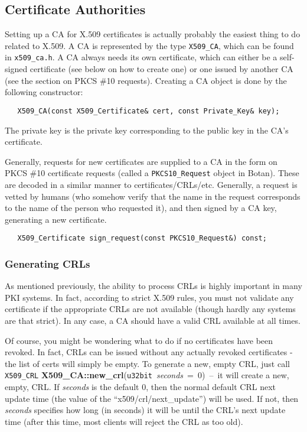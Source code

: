 \documentclass{article}
\newcommand{\filename}[1]{\texttt{#1}}
\newcommand{\function}[1]{\textbf{#1}}
\newcommand{\type}[1]{\texttt{#1}}
\renewcommand{\arg}[1]{\textsl{#1}}
\begin{document}
\subsection{Certificate Authorities}

Setting up a CA for X.509 certificates is actually probably the easiest thing
to do related to X.509. A CA is represented by the type \type{X509\_CA}, which
can be found in \filename{x509\_ca.h}. A CA always needs its own certificate,
which can either be a self-signed certificate (see below on how to create one)
or one issued by another CA (see the section on PKCS \#10 requests). Creating
a CA object is done by the following constructor:

\begin{verbatim}
   X509_CA(const X509_Certificate& cert, const Private_Key& key);
\end{verbatim}

The private key is the private key corresponding to the public key in the
CA's certificate.

Generally, requests for new certificates are supplied to a CA in the form on
PKCS \#10 certificate requests (called a \type{PKCS10\_Request} object in
Botan). These are decoded in a similar manner to
certificates/CRLs/etc. Generally, a request is vetted by humans (who somehow
verify that the name in the request corresponds to the name of the person who
requested it), and then signed by a CA key, generating a new certificate.

\begin{verbatim}
   X509_Certificate sign_request(const PKCS10_Request&) const;
\end{verbatim}

\subsubsection{Generating CRLs}

As mentioned previously, the ability to process CRLs is highly important in
many PKI systems. In fact, according to strict X.509 rules, you must not
validate any certificate if the appropriate CRLs are not available (though
hardly any systems are that strict). In any case, a CA should have a valid CRL
available at all times.

Of course, you might be wondering what to do if no certificates have been
revoked. In fact, CRLs can be issued without any actually revoked certificates
- the list of certs will simply be empty. To generate a new, empty CRL, just
call \type{X509\_CRL}
\function{X509\_CA::new\_crl}(\type{u32bit}~\arg{seconds}~=~0)~--~it will
create a new, empty, CRL. If \arg{seconds} is the default 0, then the normal
default CRL next update time (the value of the ``x509/crl/next\_update'') will
be used. If not, then \arg{seconds} specifies how long (in seconds) it will be
until the CRL's next update time (after this time, most clients will reject the
CRL as too old).
\end{document}
